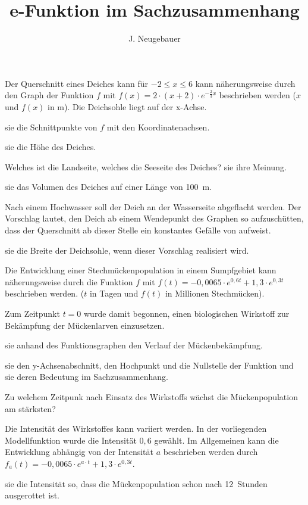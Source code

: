 \documentclass[11pt, a5paper, landscape, final]{scrartcl}
\author{J. Neugebauer}
\title{e-Funktion im Sachzusammenhang}
\date{\Heute}
\begin{document}
	\begin{aufgabe}
		Der Querschnitt eines Deiches kann für $-2 \leq x \leq 6$ kann näherungsweise durch den Graph der Funktion $f$ mit $f(x) = 2\cdot (x+2)\cdot e^{-\tfrac{2}{3}x}$ beschrieben werden ($x$ und $f(x)$ in \si{\meter}). Die Deichsohle liegt auf der x-Achse.
		
		\begin{enumeratea}
			\item {} sie die Schnittpunkte von $f$ mit den Koordinatenachsen. 
			\item {} sie die Höhe des Deiches.
			\item Welches ist die Landseite, welches die Seeseite des Deiches?  sie ihre Meinung.
			\item {} sie das Volumen des Deiches auf einer Länge von \SI{100}{\meter}.
			\item Nach einem Hochwasser soll der Deich an der Wasserseite abgeflacht werden. Der Vorschlag lautet, den Deich ab einem Wendepunkt des Graphen so aufzuschütten, dass der Querschnitt ab dieser Stelle ein konstantes Gefälle von  aufweist.
			
			 sie die Breite der Deichsohle, wenn dieser Vorschlag realisiert wird.
		\end{enumeratea}
	\end{aufgabe}
	\clearpage
	
	\begin{aufgabe}
		Die Entwicklung einer Stechmückenpopulation in einem Sumpfgebiet kann näherungsweise durch die Funktion $f$ mit $f(t) = -0,0065\cdot e^{0,6t} + 1,3\cdot e^{0,3t}$ beschrieben werden. ($t$ in Tagen und $f(t)$ in Millionen Stechmücken).
		
		Zum Zeitpunkt $t = 0$ wurde damit begonnen, einen biologischen Wirkstoff zur Bekämpfung der Mückenlarven einzusetzen.
		\begin{enumeratea}
			\item {} sie anhand des Funktionsgraphen den Verlauf der Mückenbekämpfung.
			
			 sie den y-Achsenabschnitt, den Hochpunkt und die Nullstelle der Funktion und  sie deren Bedeutung im Sachzusammenhang.
			
			\item Zu welchem Zeitpunk nach Einsatz des Wirkstoffs wächst die Mückenpopulation am stärksten?
			
			\item Die Intensität des Wirkstoffes kann variiert werden. In der vorliegenden Modellfunktion wurde die Intensität $0,6$ gewählt. Im Allgemeinen kann die Entwicklung abhängig von der Intensität $a$ beschrieben werden durch $f_a(t) = -0,0065\cdot e^{a\cdot t} + 1,3\cdot e^{0,3t}$.
			
			 sie die Intensität so, dass die Mückenpopulation schon nach \SI{12}{Stunden} ausgerottet ist.
		\end{enumeratea}
	\end{aufgabe}
	\clearpage
	
\end{document}
